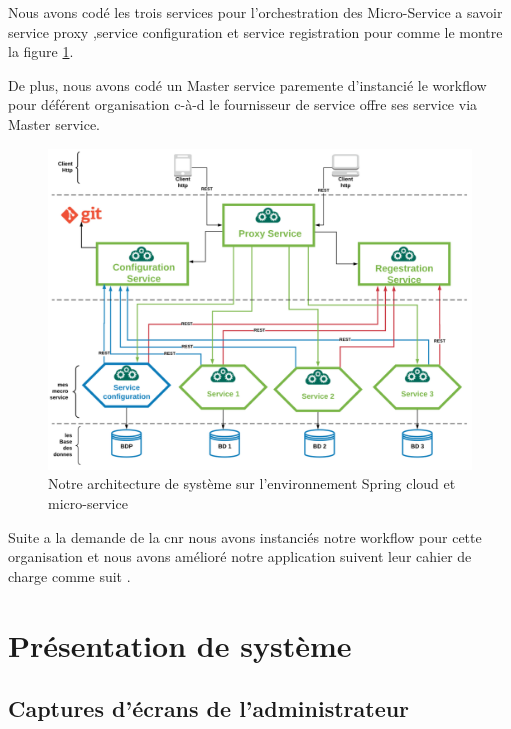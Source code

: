  
    Nous avons codé  les trois services pour l'orchestration des Micro-Service a  savoir service proxy ,service  configuration et service   registration   pour  comme le montre  la figure \ref{fig:cloudms}.
    
      De plus, nous avons codé un Master service paremente d'instancié le workflow pour déférent organisation c-à-d le fournisseur de service offre ses service via Master service.
 \begin{figure}[H]
 	\centering
 	\includegraphics[width=1\linewidth]{images/cloudMS}
 	\caption{Notre architecture de système sur l'environnement Spring cloud et micro-service}
 	\label{fig:cloudms}
 \end{figure}
 
     Suite a la demande de la \ac{cnr} nous avons instanciés notre workflow pour cette organisation et nous avons amélioré notre application suivent  leur  cahier de charge comme suit .
     
          


 
  
  
 \section{Présentation de système }

 

 \subsection{Captures d'écrans de l'administrateur }
